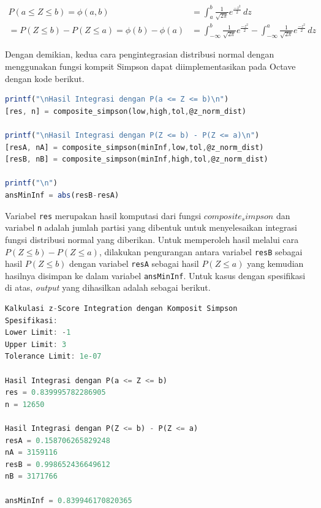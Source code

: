 \documentclass[journal,12pt,onecolumn,a4paper]{IEEEtran}
\begin{document}
\begin{equation*}
	\begin{split}
		P(a \le Z \le b )  = \phi(a,b) & = \int_{a}^{b} \frac{1}{\sqrt{2\pi}}e ^{\frac{-z^2}{2}} \,dz \\
		=  P(Z \le b ) - P(Z \le a )  = \phi(b)-\phi(a) & =  \int_{-\infty}^{b} \frac{1}{\sqrt{2\pi}}e ^{\frac{-z^2}{2}} - \int_{-\infty}^{a} \frac{1}{\sqrt{2\pi}}e ^{\frac{-z^2}{2}} \,dz
	\end{split}
\end{equation*}

Dengan demikian, kedua cara pengintegrasian distribusi normal dengan menggunakan fungsi kompsit Simpson dapat diimplementasikan pada Octave dengan kode berikut.

\begin{center}
	\begin{lstlisting}[language=Octave]
printf("\nHasil Integrasi dengan P(a <= Z <= b)\n")
[res, n] = composite_simpson(low,high,tol,@z_norm_dist)
		
printf("\nHasil Integrasi dengan P(Z <= b) - P(Z <= a)\n")
[resA, nA] = composite_simpson(minInf,low,tol,@z_norm_dist)
[resB, nB] = composite_simpson(minInf,high,tol,@z_norm_dist)
		
printf("\n")
ansMinInf = abs(resB-resA)
	\end{lstlisting}
\end{center}

Variabel \lstinline{res} merupakan hasil komputasi dari fungsi \(composite_simpson\) dan variabel \lstinline{n} adalah jumlah partisi yang dibentuk untuk menyelesaikan integrasi fungsi distribusi normal yang diberikan. Untuk memperoleh hasil melalui cara \(P(Z \le b ) - P(Z \le a )\), dilakukan pengurangan antara variabel \lstinline{resB} sebagai hasil \(P(Z \le b )\) dengan variabel \lstinline{resA} sebagai hasil \(P(Z \le a )\) yang kemudian hasilnya disimpan ke dalam variabel \lstinline{ansMinInf}. Untuk kasus dengan spesifikasi di atas, \emph{output} yang dihasilkan adalah sebagai berikut.

\begin{center}
	\begin{lstlisting}[language=Octave]
Kalkulasi z-Score Integration dengan Komposit Simpson
Spesifikasi:
Lower Limit: -1
Upper Limit: 3
Tolerance Limit: 1e-07
		
Hasil Integrasi dengan P(a <= Z <= b)
res = 0.839995782286905
n = 12650
		
Hasil Integrasi dengan P(Z <= b) - P(Z <= a)
resA = 0.158706265829248
nA = 3159116
resB = 0.998652436649612
nB = 3171766
		
ansMinInf = 0.839946170820365
	\end{lstlisting}
\end{center}
\end{document}
